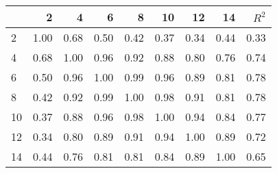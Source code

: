 \begin{tabular}{lrrrrrrrr}
\toprule
{} &     2 &     4 &     6 &     8 &    10 &    12 &    14 &  $R^2$ \\
\midrule
2  &  1.00 &  0.68 &  0.50 &  0.42 &  0.37 &  0.34 &  0.44 &   0.33 \\
4  &  0.68 &  1.00 &  0.96 &  0.92 &  0.88 &  0.80 &  0.76 &   0.74 \\
6  &  0.50 &  0.96 &  1.00 &  0.99 &  0.96 &  0.89 &  0.81 &   0.78 \\
8  &  0.42 &  0.92 &  0.99 &  1.00 &  0.98 &  0.91 &  0.81 &   0.78 \\
10 &  0.37 &  0.88 &  0.96 &  0.98 &  1.00 &  0.94 &  0.84 &   0.77 \\
12 &  0.34 &  0.80 &  0.89 &  0.91 &  0.94 &  1.00 &  0.89 &   0.72 \\
14 &  0.44 &  0.76 &  0.81 &  0.81 &  0.84 &  0.89 &  1.00 &   0.65 \\
\bottomrule
\end{tabular}
